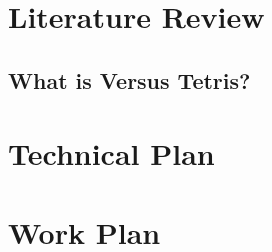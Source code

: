\documentclass[a4paper, 12pt]{extreport}
\begin{document}
	
	\chapter{Literature Review}
		
		
		\section{What is Versus Tetris?}
	
	\chapter{Technical Plan}
	
	
	\chapter{Work Plan}
		
	
	\printbibliography[heading={bibnumbered}, title={References}]
		
\end{document}
